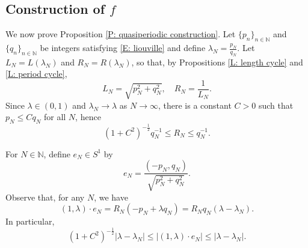 \documentclass[12pt]{amsart}
\begin{document}
\subsection{Construction of $f$} \label{S: construction quasiperiodic} We now prove Proposition \ref{P: quasiperiodic construction}.   Let $\{p_{n}\}_{n \in \mathbb{N}}$ and $\{q_{n}\}_{n \in \mathbb{N}}$ be integers satisfying \eqref{E: liouville} and define $\lambda_{N} = \frac{p_{N}}{q_{N}}$.   Let $L_{N} = L(\lambda_{N})$ and $R_{N} = R(\lambda_{N})$, so that, by Propositions \ref{L: length cycle} and \ref{L: period cycle},
	\begin{equation} \label{E: lengths}
		L_{N} = \sqrt{ p_{N}^{2} + q_{N}^{2} }, \quad R_{N} = \frac{ 1 }{ L_{N} }.
	\end{equation}
Since $\lambda \in (0,1)$ and $\lambda_{N} \to \lambda$ as $N \to \infty$, there is a constant $C > 0$ such that $p_{N} \leq C q_{N}$ for all $N$, hence
	\begin{equation*}
		(1 + C^{2})^{-\frac{1}{2}} q_{N}^{-1} \leq R_{N} \leq q_{N}^{-1}.
	\end{equation*}

For $N \in \mathbb{N}$, define $e_{N} \in S^{1}$ by 
	\begin{equation*}
		e_{N} = \frac{(-p_{N},q_{N})}{\sqrt{p_{N}^{2} + q_{N}^{2}}}.
	\end{equation*}
Observe that, for any $N$, we have
	\begin{equation*}
		(1,\lambda) \cdot e_{N} = R_{N} (-p_{N} + \lambda q_{N}) = R_{N} q_{N} (\lambda - \lambda_{N}).
	\end{equation*}
In particular,
	\begin{equation*}
		(1 + C^{2})^{-\frac{1}{2}} |\lambda - \lambda_{N}| \leq |(1,\lambda) \cdot e_{N}| \leq |\lambda - \lambda_{N}|.
	\end{equation*}
\end{document}
